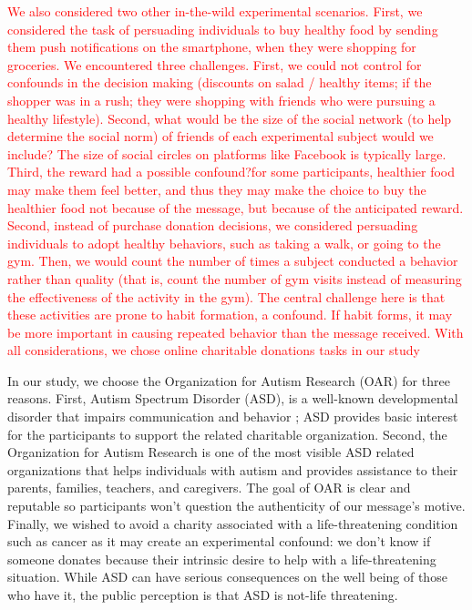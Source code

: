 \textcolor{red}{We also considered two other in-the-wild experimental scenarios. First, we considered the task of persuading individuals to buy healthy food by sending them push notifications on the smartphone, when they were shopping for groceries. We encountered three challenges. First, we could not control for confounds in the decision making (discounts on salad / healthy items; if the shopper was in a rush; they were shopping with friends who were pursuing a healthy lifestyle). Second, what would be the size of the social network (to help determine the social norm) of friends of each experimental subject would we include? The size of social circles on platforms like Facebook is typically large. Third, the reward had a possible confound?for some participants, healthier food may make them feel better, and thus they may make the choice to buy the healthier food not because of the message, but because of the anticipated reward. Second, instead of purchase donation decisions, we considered persuading individuals to adopt healthy behaviors, such as taking a walk, or going to the gym. Then, we would count the number of times a subject conducted a behavior rather than quality (that is, count the number of gym visits instead of measuring the effectiveness of the activity in the gym). The central challenge here is that these activities are prone to habit formation, a confound. If habit forms, it may be more important in causing repeated behavior than the message received. With all considerations, we chose online charitable donations tasks in our study} 

In our study, we choose the Organization for Autism Research (OAR) for three reasons. First, Autism Spectrum Disorder (ASD), is a well-known developmental disorder that impairs communication and behavior \cite{american2013diagnostic}; ASD provides basic interest for the participants to support the related charitable organization. Second, the Organization for Autism Research is one of the most visible ASD related organizations that helps individuals with autism and provides assistance to their parents, families, teachers, and caregivers. The goal of OAR is clear and reputable so participants won't question the authenticity of our message's motive. Finally, we wished to avoid a charity associated with a life-threatening condition such as cancer as it may create an experimental confound: we don't know if someone donates because their intrinsic desire to help with a life-threatening situation. While ASD can have serious consequences on the well being of those who have it, the public perception is that ASD is not-life threatening. 

